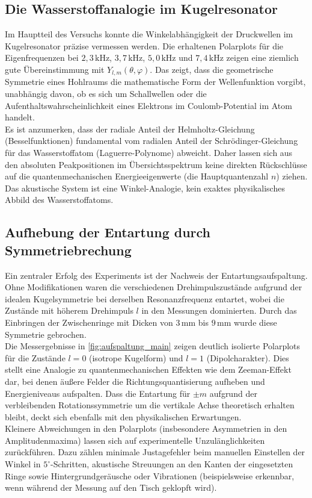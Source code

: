 \subsection{Die Wasserstoffanalogie im Kugelresonator}
Im Hauptteil des Versuchs konnte die Winkelabhängigkeit der Druckwellen im
Kugelresonator präzise vermessen werden. Die erhaltenen Polarplots für die
Eigenfrequenzen bei $2{,}3\,\text{kHz}$, $3{,}7\,\text{kHz}$, $5{,}0\,\text{kHz}$
und $7{,}4\,\text{kHz}$ zeigen eine ziemlich gute Übereinstimmung mit
$Y_{l,m}(\theta, \varphi)$. Das zeigt, dass die geometrische Symmetrie eines
Hohlraums die mathematische Form der Wellenfunktion vorgibt, unabhängig davon,
ob es sich um Schallwellen oder die Aufenthaltswahrscheinlichkeit eines Elektrons
im Coulomb-Potential im Atom handelt. 
\vspace{0.5em} \\
\noindent Es ist anzumerken, dass der radiale Anteil der Helmholtz-Gleichung
(Besselfunktionen) fundamental vom radialen Anteil der Schrödinger-Gleichung
für das Wasserstoffatom (Laguerre-Polynome) abweicht. Daher lassen sich aus den
absoluten Peakpositionen im Übersichtsspektrum keine direkten Rückschlüsse auf
die quantenmechanischen Energieeigenwerte (die Hauptquantenzahl $n$) ziehen.
Das akustische System ist eine Winkel-Analogie, kein exaktes physikalisches 
Abbild des Wasserstoffatoms.

\subsection{Aufhebung der Entartung durch Symmetriebrechung}
Ein zentraler Erfolg des Experiments ist der Nachweis der Entartungsaufspaltung.
Ohne Modifikationen waren die verschiedenen Drehimpulszustände aufgrund der
idealen Kugelsymmetrie bei derselben Resonanzfrequenz entartet, wobei die
Zustände mit höherem Drehimpuls $l$ in den Messungen dominierten. Durch das
Einbringen der Zwischenringe mit Dicken von $3\,\text{mm}$ bis $9\,\text{mm}$
wurde diese Symmetrie gebrochen. 
\vspace{0.5em} \\
\noindent Die Messergebnisse in \autoref{fig:aufspaltung_main} zeigen deutlich
isolierte Polarplots für die Zustände $l=0$ (isotrope Kugelform) und $l=1$ 
(Dipolcharakter). Dies stellt eine Analogie zu quantenmechanischen Effekten wie
dem Zeeman-Effekt dar, bei denen äußere Felder die Richtungsquantisierung 
aufheben und Energieniveaus aufspalten. Dass die Entartung für $\pm m$ aufgrund 
der verbleibenden Rotationssymmetrie um die vertikale Achse theoretisch erhalten
bleibt, deckt sich ebenfalls mit den physikalischen Erwartungen.
\vspace{0.5em} \\
\noindent Kleinere Abweichungen in den Polarplots (insbesondere Asymmetrien in
den Amplitudenmaxima) lassen sich auf experimentelle Unzulänglichkeiten 
zurückführen. Dazu zählen minimale Justagefehler beim manuellen Einstellen der
Winkel in $5^\circ$-Schritten, akustische Streuungen an den Kanten der
eingesetzten Ringe sowie Hintergrundgeräusche oder Vibrationen (beispielsweise
erkennbar, wenn während der Messung auf den Tisch geklopft wird).